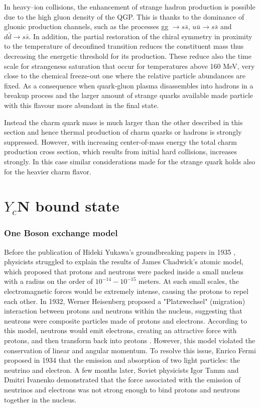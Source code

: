\documentclass[12pt,a4paper]{book}
\begin{document}
	In heavy–ion collisions, the enhancement of strange hadron production is possible due to the high gluon density of the QGP. This is thanks to the dominance of gluonic production channels, such as the processes gg $\rightarrow s \bar{s}$, $u \bar{u}\rightarrow s \bar{s}$ and $d \bar{d} \rightarrow s \bar{s}$. In addition, the partial restoration of the chiral symmetry in proximity to the temperature of deconfined transition reduces the constituent mass thus decreasing the energetic threshold for its production. These reduce also the time scale for strangeness saturation that occur for temperatures above 160 MeV, very close to the chemical freeze-out one where the relative particle abundances are fixed. As a consequence when quark-gluon plasma disassembles into hadrons in a breakup process and the larger amount of strange quarks available made particle with this flavour more abundant in the final state.
	
	Instead the charm quark mass is much larger than the other described in this section and hence thermal production of charm quarks or hadrons is strongly suppressed. However, with increasing center-of-mass energy the total charm production cross section, which results from initial hard collisions, increases strongly. In this case similar considerations made for the strange quark holds also for the heavier charm flavor.
	
	
	
	
	\FloatBarrier
	
	\chapter{$Y_c$N bound state}
	
	\subsection{One Boson exchange model}
	Before the publication of Hideki Yukawa's groundbreaking papers in 1935 \cite{yukawa}, physicists struggled to explain the results of James Chadwick's atomic model, which proposed that protons and neutrons were packed inside a small nucleus with a radius on the order of $10^{-14}-10^{-15}$ meters. At such small scales, the electromagnetic forces would be extremely intense, causing the protons to repel each other. In 1932, Werner Heisenberg proposed a "Platzwechsel" (migration) interaction between protons and neutrons within the nucleus, suggesting that neutrons were composite particles made of protons and electrons. According to this model, neutrons would emit electrons, creating an attractive force with protons, and then transform back into protons \cite{heisemerg}. However, this model violated the conservation of linear and angular momentum. To resolve this issue, Enrico Fermi proposed in 1934 that the emission and absorption of two light particles: the neutrino and electron. A few months later, Soviet physicists Igor Tamm and Dmitri Ivanenko demonstrated that the force associated with the emission of neutrinos and electrons was not strong enough to bind protons and neutrons together in the nucleus.
	
\end{document}
